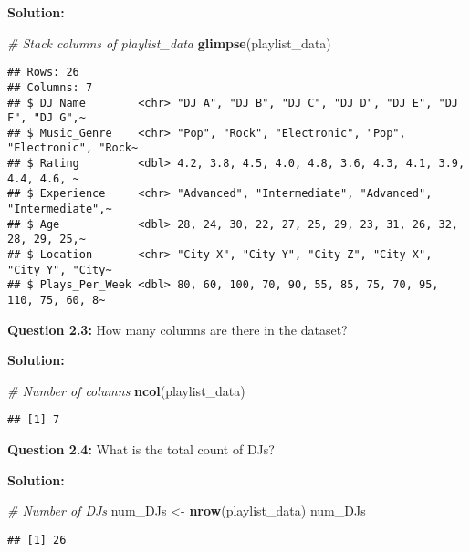 \documentclass[
]{article}
\newenvironment{Shaded}{\begin{snugshade}}{\end{snugshade}}
\newcommand{\CommentTok}[1]{\textcolor[rgb]{0.56,0.35,0.01}{\textit{#1}}}
\newcommand{\FunctionTok}[1]{\textcolor[rgb]{0.13,0.29,0.53}{\textbf{#1}}}
\newcommand{\NormalTok}[1]{#1}
\newcommand{\OtherTok}[1]{\textcolor[rgb]{0.56,0.35,0.01}{#1}}
\begin{document}
\textbf{Solution:}

\begin{Shaded}
\begin{Highlighting}[]
\CommentTok{\# Stack columns of playlist\_data}
\FunctionTok{glimpse}\NormalTok{(playlist\_data)}
\end{Highlighting}
\end{Shaded}

\begin{verbatim}
## Rows: 26
## Columns: 7
## $ DJ_Name        <chr> "DJ A", "DJ B", "DJ C", "DJ D", "DJ E", "DJ F", "DJ G",~
## $ Music_Genre    <chr> "Pop", "Rock", "Electronic", "Pop", "Electronic", "Rock~
## $ Rating         <dbl> 4.2, 3.8, 4.5, 4.0, 4.8, 3.6, 4.3, 4.1, 3.9, 4.4, 4.6, ~
## $ Experience     <chr> "Advanced", "Intermediate", "Advanced", "Intermediate",~
## $ Age            <dbl> 28, 24, 30, 22, 27, 25, 29, 23, 31, 26, 32, 28, 29, 25,~
## $ Location       <chr> "City X", "City Y", "City Z", "City X", "City Y", "City~
## $ Plays_Per_Week <dbl> 80, 60, 100, 70, 90, 55, 85, 75, 70, 95, 110, 75, 60, 8~
\end{verbatim}

\textbf{Question 2.3:} How many columns are there in the dataset?

\textbf{Solution:}

\begin{Shaded}
\begin{Highlighting}[]
\CommentTok{\# Number of columns}
\FunctionTok{ncol}\NormalTok{(playlist\_data)}
\end{Highlighting}
\end{Shaded}

\begin{verbatim}
## [1] 7
\end{verbatim}

\textbf{Question 2.4:} What is the total count of DJs?

\textbf{Solution:}

\begin{Shaded}
\begin{Highlighting}[]
\CommentTok{\# Number of DJs}
\NormalTok{num\_DJs }\OtherTok{\textless{}{-}} \FunctionTok{nrow}\NormalTok{(playlist\_data)}
\NormalTok{num\_DJs}
\end{Highlighting}
\end{Shaded}

\begin{verbatim}
## [1] 26
\end{verbatim}
\end{document}
